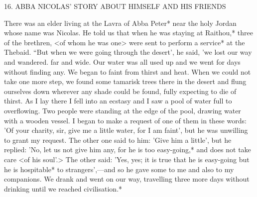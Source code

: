 16. ABBA NICOLAS' STORY
ABOUT HIMSELF AND HIS FRIENDS

There was an elder living at the Lavra of Abba Peter* near the holy
Jordan whose name was Nicolas. He told us that when he was
staying at Raithou,* three of the brethren, <of whom he was one>
were sent to perform a service* at the Thebaid. “But when we were
going through the desert', he said, 'we lost our way and wandered.
far and wide. Our water was all used up and we went for days
without finding any. We began to faint from thirst and heat. When
we could not take one more step, we found some tamarisk trees
there in the desert and flung ourselves down wherever any shade
could be found, fully expecting to die of thirst. As I lay there I fell
into an ecstasy and I saw a pool of water full to overflowing. Two
people were standing at the edge of the pool, drawing water with a
wooden vessel. I began to make a request of one of them in these
words: 'Of your charity, sir, give me a little water, for I am faint',
but he was unwilling to grant my request. The other one said to
him: 'Give him a little', but he replied: 'No, let us not give him any,
for he is too easy-going,* and does not take care <of his soul'.> The
other said: 'Yes, yes; it is true that he is easy-going but he is
hospitable* to strangers',—and so he gave some to me and also to
my companions. We drank and went on our way, travelling three
more days without drinking until we reached civilisation.*

